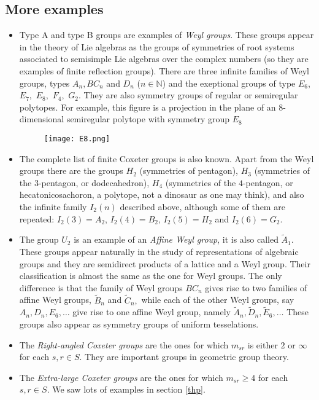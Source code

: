 \documentclass[12pt]{wart}
\theoremstyle{remark}
\begin{document}
\subsection{More examples}
\begin{itemize}
\item Type A  and type B groups are examples of \emph{Weyl groups}. These groups appear in the theory of Lie algebras as the groups of symmetries of  root systems associated to semisimple Lie algebras over the complex numbers (so they are examples of finite reflection groups). There are three infinite families of Weyl groups, types $A_n, BC_n$ and $D_n$ ($n\in \mathbb{N}$) and the exeptional groups of type  $E_6$, $E_7,$  $E_8,$ $F_4,$ $G_2$. They are also symmetry groups of regular or semiregular polytopes. For example, this figure is a projection in the plane of an $8$-dimensional semiregular polytope with symmetry group $E_8$ 
\begin{figure}[H] 
\begin{center}
 \texttt{[image: E8.png]} 
\end{center}
\end{figure} 


\item The complete list of finite Coxeter groups is also known. Apart from the Weyl groups  there are the groups $H_2$ (symmetries of pentagon), $H_3$ (symmetries of the $3$-pentagon, or dodecahedron), $H_4$ (symmetries of the $4$-pentagon, or hecatonicosachoron, a polytope, not a dinosaur as one may think), and also the  infinite family $I_2(n)$ described above, although some of them are repeated: $I_2(3)=A_2,\,  I_2(4)=B_2,\,  I_2(5)=H_2$ and  $I_2(6)=G_2$.

\item The group $U_2$  is an example of an \emph{Affine Weyl group}, it is also called  $\widetilde{A}_1$. These groups appear naturally in the study of  representations of algebraic groups and they are semidirect products of a lattice and a Weyl group. Their classification is almost the same as the one for Weyl groups. The only difference is that the family of Weyl groups $BC_n$ gives rise to two families of affine Weyl groups, $\widetilde{B}_n$ and $\widetilde{C}_n,$ while each of the other Weyl groups, say $A_n, D_n, E_6,\ldots$ give rise to one affine Weyl group, namely   $\widetilde{A}_n, \widetilde{D}_n, \widetilde{E}_6, \ldots$ These groups also appear as symmetry groups of uniform tesselations. 

\item The \emph{Right-angled Coxeter groups} are the ones for which $m_{sr}$ is either $2$ or $\infty$ for each $s,r\in S.$ They are important groups  in geometric group theory. 
\item The \emph{Extra-large Coxeter groups} are the ones for which $m_{sr}\geq 4$  for each $s,r\in S.$  We saw lots of examples in section \ref{thp}.
\end{itemize}
\end{document}
